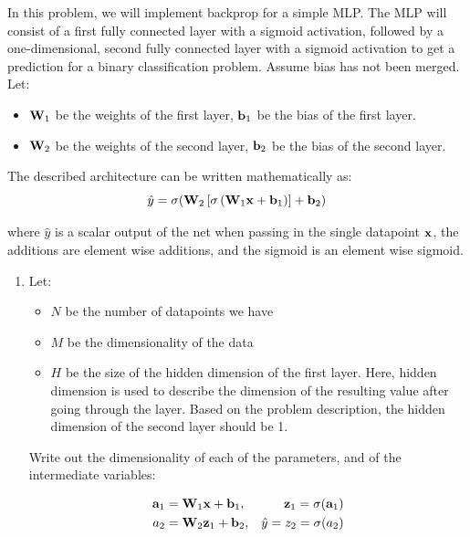 \documentclass[submit]{harvardml}
\begin{document}
\newpage
\begin{problem}[Backprop]

  In this problem, we will implement backprop for a simple MLP. The MLP will consist of a first fully connected layer with a sigmoid activation, followed by a one-dimensional, second fully connected layer with a sigmoid activation to get a prediction for a binary classification problem. Assume bias has not been merged. Let:
  \begin{itemize}
      \item $\bold{W}_1$ be the weights of the first layer, $\bold{b}_1$ be the bias of the first layer.
      \item $\bold{W}_2$ be the weights of the second layer, $\bold{b}_2$ be the bias of the second layer.
  \end{itemize}
  
  The described architecture can be written mathematically as: $$\hat{y} = \sigma(\bold{W}_2 \left[\sigma \left(\bold{W}_1 \bold{x} + \bold{b}_1\right)\right] + \bold{b}_2)$$
  
  where $\hat{y}$ is a scalar output of the net when passing in the single datapoint $\bold{x}$, the additions are element wise additions, and the sigmoid is an element wise sigmoid.
  
  \begin{enumerate}
      \item Let:
      \begin{itemize}
          \item $N$ be the number of datapoints we have
          \item $M$ be the dimensionality of the data
          \item $H$ be the size of the hidden dimension of the first layer. Here, hidden dimension is used to describe the dimension of the resulting value after going through the layer. Based on the problem description, the hidden dimension of the second layer should be 1.
      \end{itemize}
      
      Write out the dimensionality of each of the parameters, and of the intermediate variables:

          \begin{align*}
          \bold{a}_1 &= \bold{W}_1 \bold{x} + \bold{b}_1, 
          &\bold{z}_1 = \sigma(\bold{a}_1) \\
          a_2 &= \bold{W}_2 \bold{z}_1 + \bold{b}_2, 
          &\hat{y} = z_2 = \sigma(a_2)
          \end{align*}
          

\end{enumerate}
\end{problem}
\end{document}
